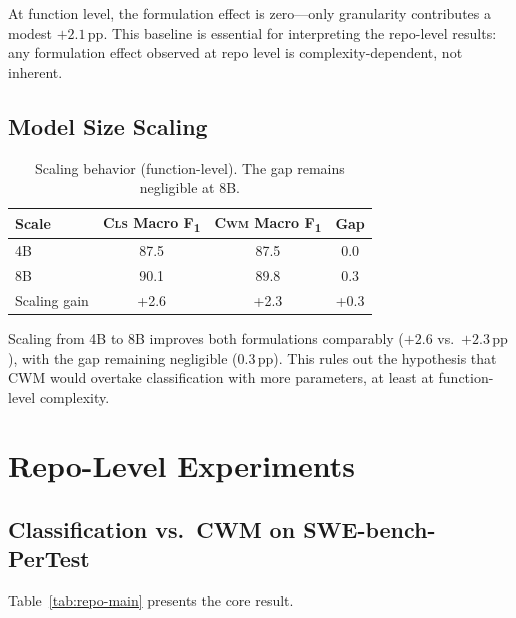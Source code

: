 \documentclass[11pt,a4paper]{article}
\newcommand{\cls}{\textsc{Cls}}
\newcommand{\cwm}{\textsc{Cwm}}
\newcommand{\fone}{F\textsubscript{1}}
\newcommand{\pp}{\,\text{pp}}
\begin{document}
At function level, the formulation effect is zero---only granularity contributes a modest $+2.1\pp$.
This baseline is essential for interpreting the repo-level results: any formulation effect observed at repo level is complexity-dependent, not inherent.

\subsection{Model Size Scaling}

\begin{table}[t]
\centering
\small
\begin{tabular}{lccc}
\toprule
\textbf{Scale} & \textbf{\cls{} Macro \fone} & \textbf{\cwm{} Macro \fone} & \textbf{Gap} \\
\midrule
4B & 87.5 & 87.5 & 0.0 \\
8B & 90.1 & 89.8 & 0.3 \\
\midrule
Scaling gain & +2.6 & +2.3 & +0.3 \\
\bottomrule
\end{tabular}
\caption{Scaling behavior (function-level). The gap remains negligible at 8B.}
\label{tab:scaling-func}
\end{table}

Scaling from 4B to 8B improves both formulations comparably ($+2.6$ vs.\ $+2.3\pp$), with the gap remaining negligible ($0.3\pp$).
This rules out the hypothesis that CWM would overtake classification with more parameters, at least at function-level complexity.

\section{Repo-Level Experiments}
\label{sec:repo-results}

\subsection{Classification vs.\ CWM on SWE-bench-PerTest}

Table~\ref{tab:repo-main} presents the core result.
\end{document}
